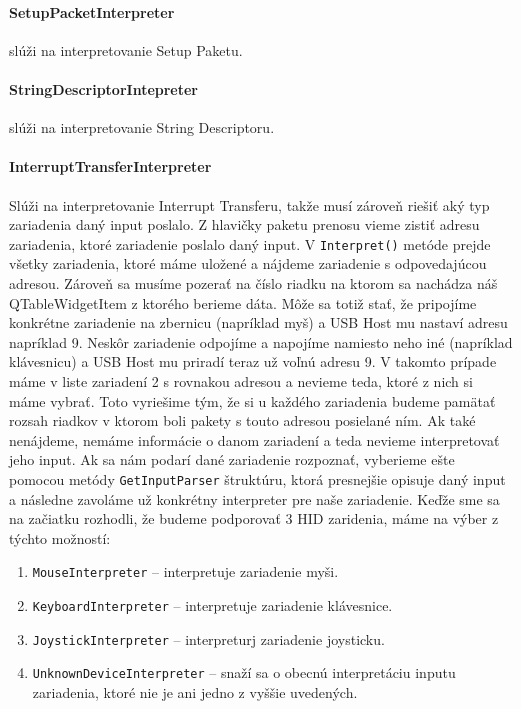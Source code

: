 \paragraph{SetupPacketInterpreter} slúži na interpretovanie Setup Paketu.

\paragraph{StringDescriptorIntepreter} slúži na interpretovanie String Descriptoru.

\paragraph{InterruptTransferInterpreter}
\hfill \break
Slúži na interpretovanie Interrupt Transferu, takže musí zároveň riešiť aký typ zariadenia daný input poslalo. Z hlavičky paketu prenosu vieme zistiť adresu zariadenia, ktoré zariadenie poslalo daný input. V \texttt{Interpret()} metóde prejde všetky zariadenia, ktoré máme uložené a nájdeme zariadenie s odpovedajúcou adresou. Zároveň sa musíme pozerať na číslo riadku na ktorom sa nachádza náš QTableWidgetItem z ktorého berieme dáta. Môže sa totiž stať, že pripojíme konkrétne zariadenie na zbernicu (napríklad myš) a USB Host mu nastaví adresu napríklad 9. Neskôr zariadenie odpojíme a napojíme namiesto neho iné (napríklad klávesnicu) a USB Host mu priradí teraz už voľnú adresu 9. V takomto prípade máme v liste zariadení 2 s rovnakou adresou a nevieme teda, ktoré z nich si máme vybrať. Toto vyriešime tým, že si u každého zariadenia budeme pamätať rozsah riadkov v ktorom boli pakety s touto adresou posielané ním. Ak také nenájdeme, nemáme informácie o danom zariadení a teda nevieme interpretovať jeho input. Ak sa nám podarí dané zariadenie rozpoznať, vyberieme ešte pomocou metódy \texttt{GetInputParser} štruktúru, ktorá presnejšie opisuje daný input a následne zavoláme už konkrétny interpreter pre naše zariadenie. Keďže sme sa na začiatku rozhodli, že budeme podporovať 3 HID zaridenia, máme na výber z týchto možností:
\begin{enumerate}
\item \texttt{MouseInterpreter} -- interpretuje zariadenie myši.
\item \texttt{KeyboardInterpreter} -- interpretuje zariadenie klávesnice.
\item \texttt{JoystickInterpreter} -- interpreturj zariadenie joysticku.
\item \texttt{UnknownDeviceInterpreter} -- snaží sa o obecnú interpretáciu inputu zariadenia, ktoré nie je ani jedno z vyššie uvedených.
\end{enumerate}

